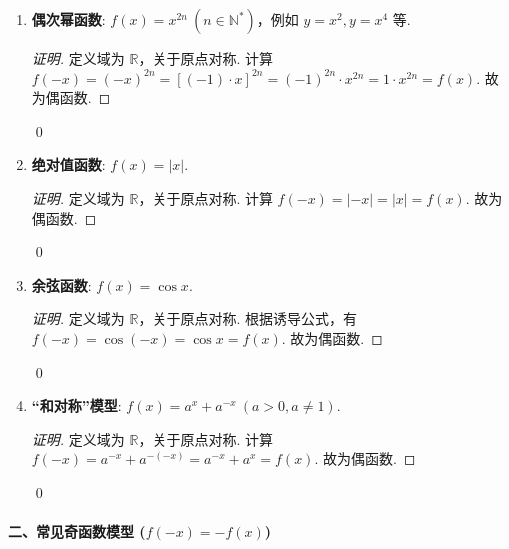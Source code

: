 \begin{enumerate}
	\item \textbf{偶次幂函数}: $f(x) = x^{2n} \ (n \in \mathbb{N}^*)$，例如 $y=x^2, y=x^4$ 等.
	\begin{proof}[证明]
		定义域为 $\mathbb{R}$，关于原点对称.
		计算 $f(-x) = (-x)^{2n} = [(-1) \cdot x]^{2n} = (-1)^{2n} \cdot x^{2n} = 1 \cdot x^{2n} = f(x)$.
		故为偶函数.
	\end{proof}
	\qed
	
	\item \textbf{绝对值函数}: $f(x) = |x|$.
	\begin{proof}[证明]
		定义域为 $\mathbb{R}$，关于原点对称.
		计算 $f(-x) = |-x| = |x| = f(x)$.
		故为偶函数.
	\end{proof}
	\qed
	
	\item \textbf{余弦函数}: $f(x) = \cos x$.
	\begin{proof}[证明]
		定义域为 $\mathbb{R}$，关于原点对称.
		根据诱导公式，有 $f(-x) = \cos(-x) = \cos x = f(x)$.
		故为偶函数.
	\end{proof}
	\qed
	
	\item \textbf{“和对称”模型}: $f(x) = a^x + a^{-x} \ (a>0, a\neq 1)$.
	\begin{proof}[证明]
		定义域为 $\mathbb{R}$，关于原点对称.
		计算 $f(-x) = a^{-x} + a^{-(-x)} = a^{-x} + a^x = f(x)$.
		故为偶函数.
	\end{proof}
	\qed
\end{enumerate}

\paragraph{二、常见奇函数模型 ($f(-x) = -f(x)$)}

